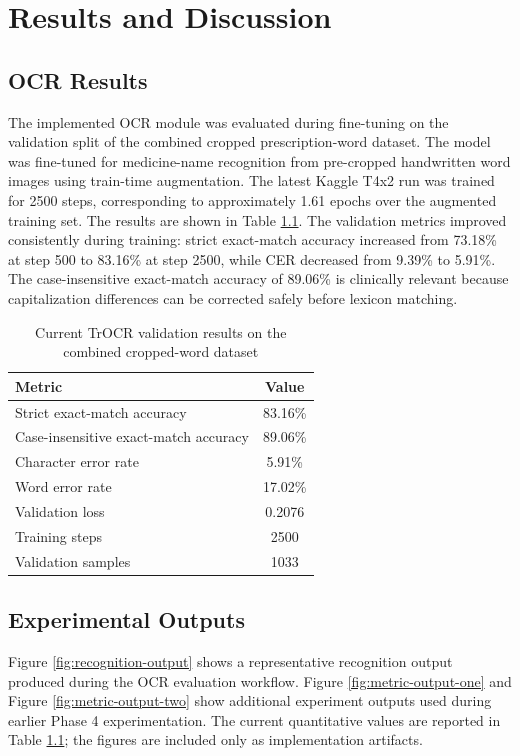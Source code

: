 \documentclass[modernstyle,12pt]{thesis}
\begin{document}
\chapter{Results and Discussion}
\label{chap:results}

\section{OCR Results}

The implemented OCR module was evaluated during fine-tuning on the validation split of the combined cropped prescription-word dataset. The model was fine-tuned for medicine-name recognition from pre-cropped handwritten word images using train-time augmentation. The latest Kaggle T4x2 run was trained for 2500 steps, corresponding to approximately 1.61 epochs over the augmented training set. The results are shown in Table \ref{tab:ocr-results}. The validation metrics improved consistently during training: strict exact-match accuracy increased from 73.18\% at step 500 to 83.16\% at step 2500, while CER decreased from 9.39\% to 5.91\%. The case-insensitive exact-match accuracy of 89.06\% is clinically relevant because capitalization differences can be corrected safely before lexicon matching.

\begin{table}[h]
\centering
\caption{Current TrOCR validation results on the combined cropped-word dataset}
\label{tab:ocr-results}
\begin{tabular}{lc}
\toprule
\textbf{Metric} & \textbf{Value} \\
\midrule
Strict exact-match accuracy & 83.16\% \\
Case-insensitive exact-match accuracy & 89.06\% \\
Character error rate & 5.91\% \\
Word error rate & 17.02\% \\
Validation loss & 0.2076 \\
Training steps & 2500 \\
Validation samples & 1033 \\
\bottomrule
\end{tabular}
\end{table}

\section{Experimental Outputs}

Figure \ref{fig:recognition-output} shows a representative recognition output produced during the OCR evaluation workflow. Figure \ref{fig:metric-output-one} and Figure \ref{fig:metric-output-two} show additional experiment outputs used during earlier Phase 4 experimentation. The current quantitative values are reported in Table \ref{tab:ocr-results}; the figures are included only as implementation artifacts.
\end{document}
